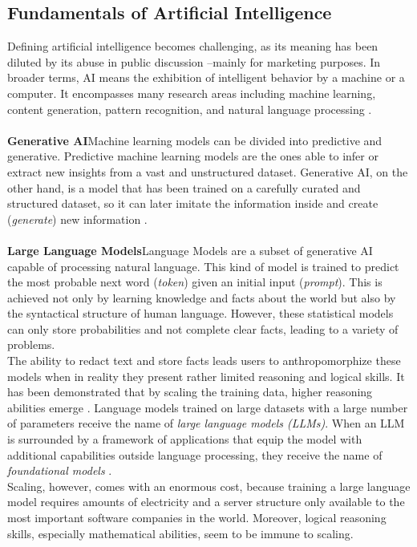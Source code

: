 \subsection{Fundamentals of Artificial Intelligence}
Defining artificial intelligence becomes challenging, as its meaning has been diluted by its abuse in public discussion --mainly for marketing purposes. In broader terms, AI means the exhibition of intelligent behavior by a machine or a computer. It encompasses many research areas including machine learning, content generation, pattern recognition, and natural language processing \parencite[cf.][pp. 1-2]{russell_artificial_2010}. \\\\
\textbf{Generative AI}\indent Machine learning models can be divided into predictive and generative. Predictive machine learning models are the ones able to infer or extract new insights from a vast and unstructured dataset. Generative AI, on the other hand, is a model that has been trained on a carefully curated and structured dataset, so it can later imitate the information inside and create (\textit{generate}) new information \parencite[cf.][p. 112]{feuerriegel_generative_2024}.\\\\
\textbf{Large Language Models}\indent Language Models are a subset of generative AI capable of processing natural language. This kind of model is trained to predict the most probable next word (\textit{token}) given an initial input (\textit{prompt}). This is achieved not only by learning knowledge and facts about the world but also by the syntactical structure of human language. However, these statistical models can only store probabilities and not complete clear facts, leading to a variety of problems.\\
The ability to redact text and store facts leads users to anthropomorphize these models when in reality they present rather limited reasoning and logical skills. It has been demonstrated that by scaling the training data, higher reasoning abilities emerge \parencite{zeng_skywork-math_2024}. Language models trained on large datasets with a large number of parameters receive the name of \textit{large language models (LLMs)}. When an LLM is surrounded by a framework of applications that equip the model with additional capabilities outside language processing, they receive the name of \textit{foundational models} \parencite[cf.][p. 82]{Amaratunga.2023}. \\
Scaling, however, comes with an enormous cost, because training a large language model requires amounts of electricity and a server structure only available to the most important software companies in the world. Moreover, logical reasoning skills, especially mathematical abilities, seem to be immune to scaling. \\\\
